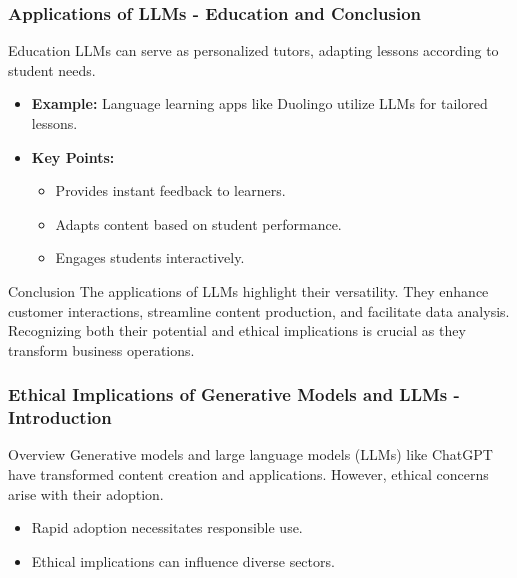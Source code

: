 \documentclass[aspectratio=169]{beamer}
\begin{document}
\begin{frame}[fragile]
    \frametitle{Applications of LLMs - Education and Conclusion}
    \begin{block}{Education}
        LLMs can serve as personalized tutors, adapting lessons according to student needs.
    \end{block}
    \begin{itemize}
        \item \textbf{Example:} Language learning apps like Duolingo utilize LLMs for tailored lessons.
        \item \textbf{Key Points:}
        \begin{itemize}
            \item Provides instant feedback to learners.
            \item Adapts content based on student performance.
            \item Engages students interactively.
        \end{itemize}
    \end{itemize}

    \vspace{1em}
    
    \begin{block}{Conclusion}
        The applications of LLMs highlight their versatility. They enhance customer interactions, streamline content production, and facilitate data analysis. Recognizing both their potential and ethical implications is crucial as they transform business operations.
    \end{block}
\end{frame}

\begin{frame}[fragile]
    \frametitle{Ethical Implications of Generative Models and LLMs - Introduction}
    \begin{block}{Overview}
        Generative models and large language models (LLMs) like ChatGPT have transformed content creation and applications. However, ethical concerns arise with their adoption.
    \end{block}
    
    \begin{itemize}
        \item Rapid adoption necessitates responsible use.
        \item Ethical implications can influence diverse sectors.
    \end{itemize}
\end{frame}
\end{document}
